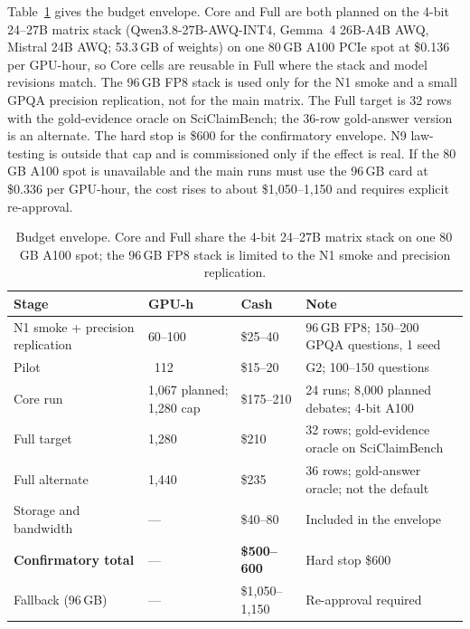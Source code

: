 Table~\ref{tab:budget} gives the budget envelope. Core and Full are both planned on the 4-bit 24--27B matrix stack (Qwen3.8-27B-AWQ-INT4, Gemma~4 26B-A4B AWQ, Mistral 24B AWQ; 53.3\,GB of weights) on one 80\,GB A100 PCIe spot at \$0.136 per GPU-hour, so Core cells are reusable in Full where the stack and model revisions match. The 96\,GB FP8 stack is used only for the N1 smoke and a small GPQA precision replication, not for the main matrix. The Full target is 32 rows with the gold-evidence oracle on SciClaimBench; the 36-row gold-answer version is an alternate. The hard stop is \$600 for the confirmatory envelope. N9 law-testing is outside that cap and is commissioned only if the effect is real. If the 80\,GB A100 spot is unavailable and the main runs must use the 96\,GB card at \$0.336 per GPU-hour, the cost rises to about \$1{,}050--1{,}150 and requires explicit re-approval.

\begin{table}[H]
  \centering
  \caption{Budget envelope. Core and Full share the 4-bit 24--27B matrix stack on one 80\,GB A100 spot; the 96\,GB FP8 stack is limited to the N1 smoke and precision replication.}
  \renewcommand{\arraystretch}{1.25}
  \small
  \begin{tabular}{|p{}|p{}|p{}|p{}|}
    \hline
    Stage & GPU-h & Cash & Note \\
    \hline
    N1 smoke + precision replication & 60--100 & \$25--40 & 96\,GB FP8; 150--200 GPQA questions, 1 seed \\
    \hline
    Pilot & ~112 & \$15--20 & G2; 100--150 questions \\
    \hline
    Core run & 1{,}067 planned; 1{,}280 cap & \$175--210 & 24 runs; 8{,}000 planned debates; 4-bit A100 \\
    \hline
    Full target & 1{,}280 & \$210 & 32 rows; gold-evidence oracle on SciClaimBench \\
    \hline
    Full alternate & 1{,}440 & \$235 & 36 rows; gold-answer oracle; not the default \\
    \hline
    Storage and bandwidth & --- & \$40--80 & Included in the envelope \\
    \hline
    \textbf{Confirmatory total} & --- & \textbf{\$500--600} & Hard stop \$600 \\
    \hline
    Fallback (96\,GB) & --- & \$1{,}050--1{,}150 & Re-approval required \\
    \hline
  \end{tabular}
  \label{tab:budget}
\end{table}

